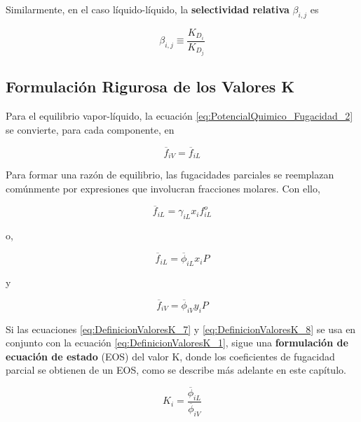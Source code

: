 \documentclass[11pt]{book}
\begin{document}
Similarmente, en el caso líquido-líquido, la \textbf{selectividad relativa} $\beta_{i,j}$ es

\begin{equation}
    \label{eq:DefinicionValoresK_4}
    \beta_{i,j} \equiv \frac{K_{D_i}}{K_{D_j}}
\end{equation}

\subsection{Formulación Rigurosa de los Valores K}

Para el equilibrio vapor-líquido, la ecuación \ref{eq:PotencialQuimico_Fugacidad_2} se convierte, para cada componente, en

\begin{equation}
    \label{eq:DefinicionValoresK_5}
    \overline{f}_{iV} = \overline{f}_{iL} 
\end{equation}

Para formar una razón de equilibrio, las fugacidades parciales se reemplazan comúnmente por expresiones que involucran fracciones molares. Con ello,

\begin{equation}
    \label{eq:DefinicionValoresK_6}
    \overline{f}_{iL} = \gamma_{iL} x_i f_{iL}^o
\end{equation}

o,

\begin{equation}
    \label{eq:DefinicionValoresK_7}
    \overline{f}_{iL} = \overline{\phi}_{iL} x_i P
\end{equation}

y

\begin{equation}
    \label{eq:DefinicionValoresK_8}
    \overline{f}_{iV} = \overline{\phi}_{iV} y_i P
\end{equation}

Si las ecuaciones \ref{eq:DefinicionValoresK_7} y \ref{eq:DefinicionValoresK_8} se usa en conjunto con la ecuación \ref{eq:DefinicionValoresK_1}, sigue una \textbf{formulación de ecuación de estado} (EOS) del valor K, donde los coeficientes de fugacidad parcial se obtienen de un EOS, como se describe más adelante en este capítulo.

\begin{equation}
    \label{eq:DefinicionValoresK_9}
    K_i = \frac{\overline{\phi}_{iL}}{\overline{\phi}_{iV}}
\end{equation}
\end{document}
